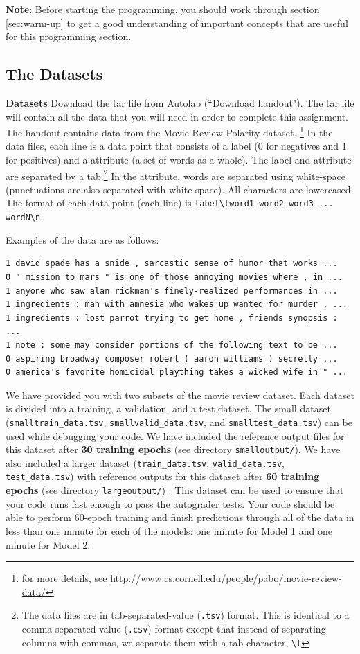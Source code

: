 \documentclass[11pt]{article}
\numberwithin{equation}{section} %
\numberwithin{figure}{section} %
\numberwithin{table}{section} %
\begin{document}
\textbf{Note}: Before starting the programming, you should work through section \ref{sec:warm-up} to get a good understanding of important concepts that are useful for this programming section. 

\subsection{The Datasets}\label{dataset}


  {\bf Datasets } Download the tar file from Autolab (``Download handout"). The tar file will contain all the data that you will need in order to complete this assignment. The handout contains data from the Movie Review Polarity dataset. \footnote{for more details, see \url{http://www.cs.cornell.edu/people/pabo/movie-review-data/}} In the data files, each line is a data point that consists of a label (0 for negatives and 1 for positives) and a attribute (a set of words as a whole). The label and attribute are separated by a tab.\footnote{The data files are in tab-separated-value (\lstinline{.tsv}) format. This is identical to a comma-separated-value (\lstinline{.csv}) format except that instead of separating columns with commas, we separate them with a tab character, \lstinline{\t}} In the attribute, words are separated using white-space (punctuations are also separated with white-space). All characters are lowercased. The format of each data point (each line) is \lstinline{label\tword1 word2 word3 ... wordN\n}.

Examples of the data are as follows:
 
\begin{lstlisting}
1 david spade has a snide , sarcastic sense of humor that works ... 
0 " mission to mars " is one of those annoying movies where , in ...
1 anyone who saw alan rickman's finely-realized performances in ...
1 ingredients : man with amnesia who wakes up wanted for murder , ...
1 ingredients : lost parrot trying to get home , friends synopsis : ... 
1 note : some may consider portions of the following text to be ...
0 aspiring broadway composer robert ( aaron williams ) secretly ...
0 america's favorite homicidal plaything takes a wicked wife in " ...
\end{lstlisting}

We have provided you with two subsets of the movie review dataset. Each dataset is divided into a training, a validation, and a test dataset.
%
The small dataset (\lstinline{smalltrain_data.tsv}, \lstinline{smallvalid_data.tsv}, and \lstinline{smalltest_data.tsv}) can be used while debugging your code. We have included the reference output files for this dataset after \textbf{30 training epochs} (see directory \lstinline{smalloutput/}). 
%
We have also included a larger dataset (\lstinline{train_data.tsv}, \lstinline{valid_data.tsv}, \lstinline{test_data.tsv}) with reference outputs for this dataset after \textbf{60 training epochs}  (see directory \lstinline{largeoutput/}) . This dataset can be used to ensure that your code runs fast enough to pass the autograder tests. Your code should be able to perform 60-epoch training and finish  predictions through all of the data in less than one minute for each of the models: one minute for Model 1 and one minute for Model 2.
\end{document}
